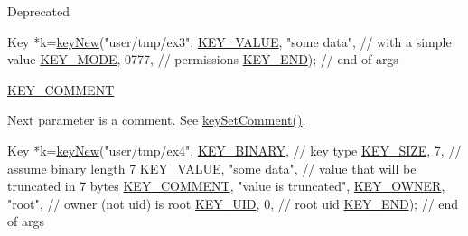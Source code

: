 \begin{DoxyRefDesc}{Deprecated}
\begin{DoxyItemize}
\begin{DoxyCodeInclude}
Key *k=\hyperlink{group__key_gad23c65b44bf48d773759e1f9a4d43b89}{keyNew}(\textcolor{stringliteral}{"user/tmp/ex3"},
        \hyperlink{group__key_gga91fb3178848bd682000958089abbaf40ac66e4a49d09212b79f5754ca6db5bd2e}{KEY\_VALUE}, \textcolor{stringliteral}{"some data"},    \textcolor{comment}{// with a simple value}
        \hyperlink{group__key_gga91fb3178848bd682000958089abbaf40a1b0a91ff3a855d6993930ebf0abaa518}{KEY\_MODE}, 0777,            \textcolor{comment}{// permissions}
        \hyperlink{group__key_gga91fb3178848bd682000958089abbaf40aa8adb6fcb92dec58fb19410eacfdd403}{KEY\_END});                  \textcolor{comment}{// end of args}
\end{DoxyCodeInclude}

\item \hyperlink{group__key_gga91fb3178848bd682000958089abbaf40ac29427bb47cc31689d02912e36161ee3}{K\-E\-Y\-\_\-\-C\-O\-M\-M\-E\-N\-T} \par
 Next parameter is a comment. See \hyperlink{group__keyvalue_ga8863a877a84fa46e6017fe72e49b89c1}{key\-Set\-Comment()}. 
\begin{DoxyCodeInclude}
Key *k=\hyperlink{group__key_gad23c65b44bf48d773759e1f9a4d43b89}{keyNew}(\textcolor{stringliteral}{"user/tmp/ex4"},
        \hyperlink{group__key_gga91fb3178848bd682000958089abbaf40a1ca18d4e094ae7487d35ecedda2235ff}{KEY\_BINARY},                   \textcolor{comment}{// key type}
        \hyperlink{group__key_gga91fb3178848bd682000958089abbaf40a6d531b5c41445d19d0452eebdccbfa01}{KEY\_SIZE}, 7,                    \textcolor{comment}{// assume binary length 7}
        \hyperlink{group__key_gga91fb3178848bd682000958089abbaf40ac66e4a49d09212b79f5754ca6db5bd2e}{KEY\_VALUE}, \textcolor{stringliteral}{"some data"},                \textcolor{comment}{// value that will be
       truncated in 7 bytes}
        \hyperlink{group__key_gga91fb3178848bd682000958089abbaf40ac29427bb47cc31689d02912e36161ee3}{KEY\_COMMENT}, \textcolor{stringliteral}{"value is truncated"},
        \hyperlink{group__key_gga91fb3178848bd682000958089abbaf40a77ca60362fa8daca8d5347db4385068b}{KEY\_OWNER}, \textcolor{stringliteral}{"root"},             \textcolor{comment}{// owner (not uid) is root}
        \hyperlink{group__key_gga91fb3178848bd682000958089abbaf40a28f01a87d65f065172f734c9c9446c0e}{KEY\_UID}, 0,                      \textcolor{comment}{// root uid}
        \hyperlink{group__key_gga91fb3178848bd682000958089abbaf40aa8adb6fcb92dec58fb19410eacfdd403}{KEY\_END});                        \textcolor{comment}{// end of args}
\end{DoxyCodeInclude}

\end{DoxyItemize}\end{DoxyRefDesc}



